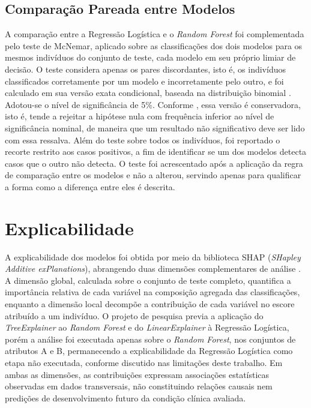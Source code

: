 \subsection{Comparação Pareada entre Modelos}\label{sec:mcnemar}
A comparação entre a Regressão Logística e o \textit{Random Forest} foi complementada pelo teste de McNemar, aplicado sobre as classificações dos dois modelos para os mesmos indivíduos do conjunto de teste, cada modelo em seu próprio limiar de decisão. O teste considera apenas os pares discordantes, isto é, os indivíduos classificados corretamente por um modelo e incorretamente pelo outro, e foi calculado em sua versão exata condicional, baseada na distribuição binomial \cite{fagerland2013mcnemar}. Adotou-se o nível de significância de 5\%. Conforme \textcite{fagerland2013mcnemar}, essa versão é conservadora, isto é, tende a rejeitar a hipótese nula com frequência inferior ao nível de significância nominal, de maneira que um resultado não significativo deve ser lido com essa ressalva. Além do teste sobre todos os indivíduos, foi reportado o recorte restrito aos casos positivos, a fim de identificar se um dos modelos detecta casos que o outro não detecta. O teste foi acrescentado após a aplicação da regra de comparação entre os modelos e não a alterou, servindo apenas para qualificar a forma como a diferença entre eles é descrita.

\section{Explicabilidade}\label{sec:explicabilidade}

A explicabilidade dos modelos foi obtida por meio da biblioteca SHAP (\textit{SHapley Additive exPlanations}), abrangendo duas dimensões complementares de análise \cite{salih2025perspective}. A dimensão global, calculada sobre o conjunto de teste completo, quantifica a importância relativa de cada variável na composição agregada das classificações, enquanto a dimensão local decompõe a contribuição de cada variável no escore atribuído a um indivíduo. O projeto de pesquisa previa a aplicação do \textit{TreeExplainer} ao \textit{Random Forest} e do \textit{LinearExplainer} à Regressão Logística, porém a análise foi executada apenas sobre o \textit{Random Forest}, nos conjuntos de atributos A e B, permanecendo a explicabilidade da Regressão Logística como etapa não executada, conforme discutido nas limitações deste trabalho. Em ambas as dimensões, as contribuições expressam associações estatísticas observadas em dados transversais, não constituindo relações causais nem predições de desenvolvimento futuro da condição clínica avaliada.

